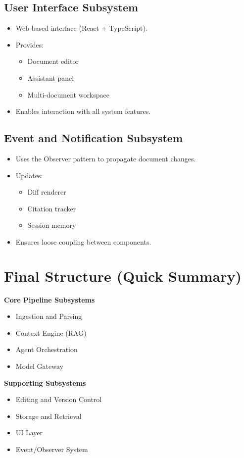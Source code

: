 \documentclass[12pt]{article}
\begin{document}
\subsection{User Interface Subsystem}
\begin{itemize}
   \item Web-based interface (React + TypeScript).
   \item Provides:
   \begin{itemize}
      \item Document editor
      \item Assistant panel
      \item Multi-document workspace
   \end{itemize}
   \item Enables interaction with all system features.
\end{itemize}

\subsection{Event and Notification Subsystem}
\begin{itemize}
   \item Uses the Observer pattern to propagate document changes.
   \item Updates:
   \begin{itemize}
      \item Diff renderer
      \item Citation tracker
      \item Session memory
   \end{itemize}
   \item Ensures loose coupling between components.
\end{itemize}

\section*{Final Structure (Quick Summary)}

\textbf{Core Pipeline Subsystems}
\begin{itemize}
   \item Ingestion and Parsing
   \item Context Engine (RAG)
   \item Agent Orchestration
   \item Model Gateway
\end{itemize}

\textbf{Supporting Subsystems}
\begin{itemize}
   \item Editing and Version Control
   \item Storage and Retrieval
   \item UI Layer
   \item Event/Observer System
\end{itemize}
\end{document}
